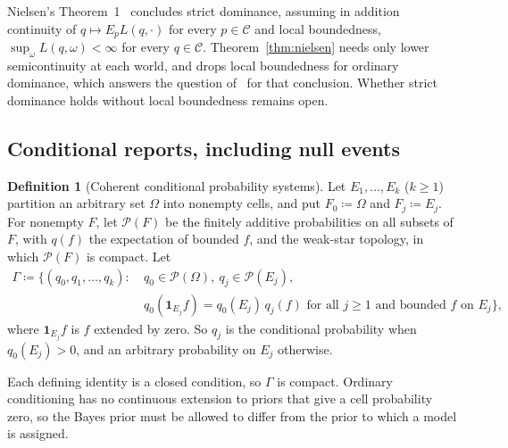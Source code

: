 \documentclass[11pt]{article}
\theoremstyle{definition}
\newtheorem{definition}[theorem]{Definition}
\theoremstyle{remark}
\newcommand{\C}{\mathcal C}
\newcommand{\PP}{\mathcal P}
\newcommand{\one}{\mathbf 1}
\begin{document}
Nielsen's Theorem~1~\cite{Nielsen} concludes strict dominance, assuming in addition continuity of $q\mapsto E_pL(q,\cdot)$ for every $p\in\C$ and local boundedness, $\sup_\omega L(q,\omega)<\infty$ for every $q\in\C$. Theorem~\ref{thm:nielsen} needs only lower semicontinuity at each world, and drops local boundedness for ordinary dominance, which answers the question of~\cite[\S4.2.1]{Nielsen} for that conclusion. Whether strict dominance holds without local boundedness remains open.

\subsection{Conditional reports, including null events}\label{sec:conditional}
\begin{definition}[Coherent conditional probability systems]\label{def:conditional-systems}
Let $E_1,\dots,E_k$ ($k\ge1$) partition an arbitrary set $\Omega$ into nonempty cells, and put $F_0\coloneqq\Omega$ and $F_j\coloneqq E_j$. For nonempty $F$, let $\PP(F)$ be the finitely additive probabilities on all subsets of $F$, with $q(f)$ the expectation of bounded $f$, and the weak-star topology, in which $\PP(F)$ is compact. Let
\[
\begin{aligned}
\Gamma\coloneqq\bigl\{(q_0,q_1,\dots,q_k):\ & q_0\in\PP(\Omega),\ q_j\in\PP(E_j),\\
& q_0(\one_{E_j}f)=q_0(E_j)\,q_j(f)\text{ for all }j\ge1\text{ and bounded }f\text{ on }E_j\bigr\},
\end{aligned}
\]
where $\one_{E_j}f$ is $f$ extended by zero. So $q_j$ is the conditional probability when $q_0(E_j)>0$, and an arbitrary probability on $E_j$ otherwise.
\end{definition}

Each defining identity is a closed condition, so $\Gamma$ is compact. Ordinary conditioning has no continuous extension to priors that give a cell probability zero, so the Bayes prior must be allowed to differ from the prior to which a model is assigned.
\end{document}
